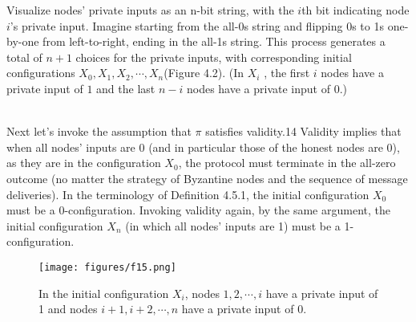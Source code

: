 \begin{myproof}
Visualize nodes’ private inputs as an n-bit string, with the $i$th bit
indicating node $i$’s private input. Imagine starting from the all-0s string and flipping 0s to 1s
one-by-one from left-to-right, ending in the all-1s string. This process generates a total of $n+1$
choices for the private inputs, with corresponding initial configurations $X_0, X_1, X_2, \cdots, X_n$(Figure 4.2). (In $X_i$
, the first $i$ nodes have a private input of $1$ and the last $n − i$ nodes have a private input of 0.)\end{myproof}\\

Next let’s invoke the assumption that $\pi$ satisfies validity.14 Validity implies that when
all nodes’ inputs are 0 (and in particular those of the honest nodes are 0), as they are in
the configuration $X_0$, the protocol must terminate in the all-zero outcome (no matter the
strategy of Byzantine nodes and the sequence of message deliveries). In the terminology of Definition 4.5.1, the initial configuration $X_0$ must be a 0-configuration. Invoking validity again, by the same argument, the initial configuration $X_n$ (in which all nodes’ inputs are 1) must be a 1-configuration.

\begin{figure}[h]
    \centering
    \texttt{[image: figures/f15.png]}
    \caption{ In the initial configuration $X_i$, nodes $1, 2, \cdots, i$ have a private input of 1 and nodes $i + 1, i + 2, \cdots, n$ have a private input of 0.}
    \label{fig:mesh1}
\end{figure}\\

